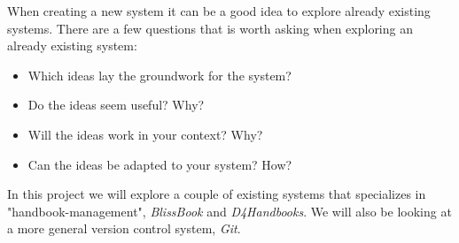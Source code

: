 When creating a new system it can be a good idea to explore already existing systems.%
There are a few questions that is worth asking when exploring an already existing system:

\begin{itemize}
  \item Which ideas lay the groundwork for the system?
  \item Do the ideas seem useful? Why?
  \item Will the ideas work in your context? Why?
  \item Can the ideas be adapted to your system? How?
\end{itemize}


In this project we will explore a couple of existing systems that specializes in "handbook-management", \textit{BlissBook} and \textit{D4Handbooks}. We will also be looking at a more general version control system, \textit{Git}. %
